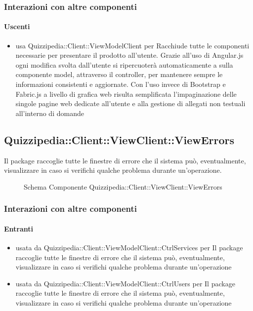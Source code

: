 \subsubsection{Interazioni con altre componenti}
\paragraph{Uscenti}
\begin{itemize}
\item usa Quizzipedia::Client::ViewModelClient per Racchiude tutte le componenti necessarie per presentare il prodotto all'utente.
Grazie all'uso di Angular.js ogni modifica svolta dall'utente si ripercuoterà automaticamente a sulla componente model, attraverso il controller, per mantenere sempre le informazioni consistenti e aggiornate.
Con l'uso invece di Bootstrap e Fabric.js a livello di grafica web risulta semplificata l'impaginazione delle singole pagine web dedicate all'utente e alla gestione di allegati non testuali all'interno di domande
\end{itemize}
\subsection{Quizzipedia::Client::ViewClient::ViewErrors}
Il package raccoglie tutte le finestre di errore che il sistema può, eventualmente, visualizzare in caso si verifichi qualche problema durante un'operazione.
\begin{figure}[H]
\centering
\noindent{}
\caption[Schema Componente Quizzipedia::Client::ViewClient::ViewErrors]{Schema Componente Quizzipedia::Client::ViewClient::ViewErrors}
\end{figure}
\subsubsection{Interazioni con altre componenti}
\paragraph{Entranti}
\begin{itemize}
\item usata da Quizzipedia::Client::ViewModelClient::CtrlServices per Il package raccoglie tutte le finestre di errore che il sistema può, eventualmente, visualizzare in caso si verifichi qualche problema durante un'operazione
\item usata da Quizzipedia::Client::ViewModelClient::CtrlUsers per Il package raccoglie tutte le finestre di errore che il sistema può, eventualmente, visualizzare in caso si verifichi qualche problema durante un'operazione
\end{itemize}
